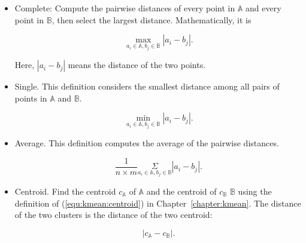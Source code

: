 \begin{itemize}
\item Complete: Compute the pairwise distances of every point in
  $\mathds{A}$ and every point in $\mathds{B}$, then select the
  largest distance.  Mathematically, it is

  \begin{equation}
    \underset{a_i \in \mathds{A}, b_j \in \mathds{B}}{\max}
         {|a_i - b_j|}.
  \end{equation}

  Here, $|a_i - b_j|$ means the distance of the two points.

\item Single. This definition considers the smallest distance
  among all pairs of points in $\mathds{A}$ and $\mathds{B}$.
  
  \begin{equation}
    \underset{a_i \in \mathds{A}, b_j \in \mathds{B}}{\min}
         {|a_i - b_j|}.
  \end{equation}

\item Average. This definition computes the average of the pairwise
  distances.

  \begin{equation}
\frac{1}{n \times m}    \underset{a_i \in \mathds{A}, b_j \in \mathds{B}}{\Sigma}
         {|a_i - b_j|}.
  \end{equation}

\item Centroid. Find the centroid $c_{\mathds{A}}$ of $\mathds{A}$ and
  the centroid of $c_{\mathds{B}}$ $\mathds{B}$ using the definition
  of (\ref{equ:kmean:centroid}) in Chapter~\ref{chapter:kmean}.
  The distance of the two clusters is the distance of the two
  centroid:

  \begin{equation}
| c_{\mathds{A}} - c_{\mathds{B}} |.
    \end{equation}

  
\end{itemize}

\clearpage



